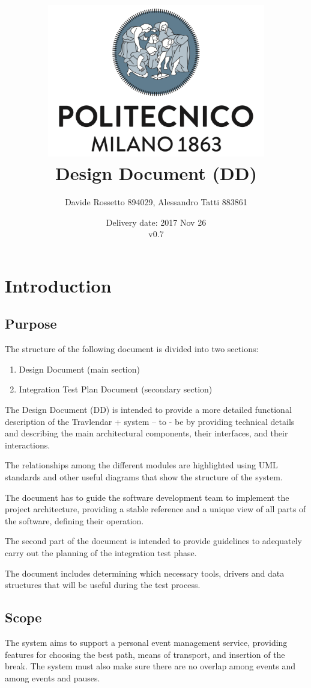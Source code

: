 \documentclass{article}
\title{ 
	\includegraphics[width=95mm]{img/PolimiLogo.png} \\
	\bigskip
	Design Document (DD)
}
\author{
	Davide Rossetto 894029, Alessandro Tatti 883861
}
\date{
	Delivery date: 2017 Nov 26\\
	\bigskip v0.7
}
\begin{document}
	
\maketitle
\newpage
\tableofcontents
\newpage
	
	
	\section{Introduction}
	

	\subsection{Purpose}
	The structure of the following document is divided into two sections:
	\begin{enumerate}
	\item Design Document (main section)
	\item Integration Test Plan Document (secondary section)
	\end{enumerate}

	\bigskip
	The Design Document (DD) is intended to provide a more detailed functional description of the Travlendar + system – to - be by providing technical details and describing the main architectural components, their interfaces, and their interactions.
	
	The relationships among the different modules are highlighted using UML standards and other useful diagrams that show the structure of the system.
	
	The document has to guide the software development team to implement the project architecture, providing a stable reference and a unique view of all parts of the software, defining their operation.

	\bigskip
	The second part of the document is intended to provide guidelines to adequately carry out the planning of the integration test phase.
	
	The document includes determining which necessary tools, drivers and data structures that will be useful during the test process.

	
	
	\subsection{Scope}
	The system aims to support a personal event management service, providing features for choosing the best path, means of transport, and insertion of the break. The system must also make sure there are no overlap among events and among events and pauses.
\end{document}
